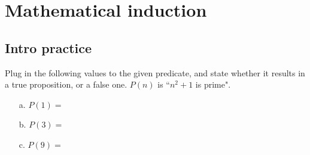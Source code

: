 
\newcommand{\laClass}       {CS 210}
\newcommand{\laSemester}    {Spring 2018}
\newcommand{\laChapter}     {2.3}
\newcommand{\laType}        {Exercise}
\newcommand{\laPoints}      {5}
\newcommand{\laTitle}       {Mathematical Induction}
\newcommand{\laDate}        {}
\setcounter{chapter}{2}
\setcounter{section}{3}
\addtocounter{section}{-1}

\toggletrue{answerkey}
\togglefalse{answerkey}





    \section{Mathematical induction}

    \subsection{Intro practice}

        \begin{questionNOGRADE}{\thequestion}

            Plug in the following values to the given predicate, and state
            whether it results in a true proposition, or a false one.
            $P(n)$ is ``$n^{2} + 1$ is prime".

            \begin{itemize}
                \item[a.] $P(1) = $ 
                \item[b.] $P(3) = $ 
                \item[c.] $P(9) = $ 
            \end{itemize}
            
        \end{questionNOGRADE}

        \hrulefill

